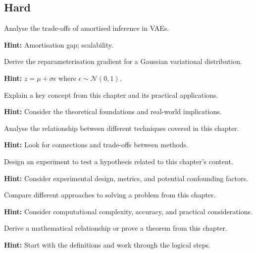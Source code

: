 \subsection*{Hard}

\begin{problem}
Analyse the trade-offs of amortised inference in VAEs.

\textbf{Hint:} Amortisation gap; scalability.
\end{problem}

\begin{problem}
Derive the reparameterisation gradient for a Gaussian variational distribution.

\textbf{Hint:} $z = \mu + \sigma \epsilon$ where $\epsilon \sim \mathcal{N}(0,1)$.
\end{problem}


\begin{problem}
Explain a key concept from this chapter and its practical applications.

\textbf{Hint:} Consider the theoretical foundations and real-world implications.
\end{problem}

\begin{problem}
Analyse the relationship between different techniques covered in this chapter.

\textbf{Hint:} Look for connections and trade-offs between methods.
\end{problem}

\begin{problem}
Design an experiment to test a hypothesis related to this chapter's content.

\textbf{Hint:} Consider experimental design, metrics, and potential confounding factors.
\end{problem}

\begin{problem}
Compare different approaches to solving a problem from this chapter.

\textbf{Hint:} Consider computational complexity, accuracy, and practical considerations.
\end{problem}

\begin{problem}
Derive a mathematical relationship or prove a theorem from this chapter.

\textbf{Hint:} Start with the definitions and work through the logical steps.
\end{problem}


